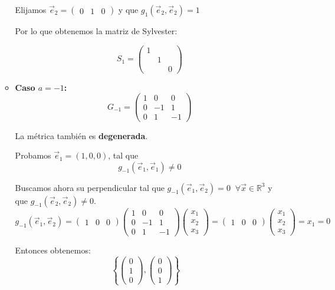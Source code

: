 \documentclass[12pt]{article}
\begin{document}
\begin{ejercicio}[4 puntos]
\begin{enumerate}
\begin{itemize}
				Elijamos \( \vec{e}_2 = \begin{pmatrix} 0 & 1 & 0 \end{pmatrix}\) y que \(g_{1}(\vec{e}_2, \vec{e}_2) = 1\)
				
				Por lo que obtenemos la matriz de Sylvester:
				
				\[
				S_1 = \begin{pmatrix}
					1 &   &   \\
					& 1 &   \\
					&   & 0
				\end{pmatrix}
				\]
				\item \textbf{Caso \( a = -1 \):}
				\[
				G_{-1} = 
				\begin{pmatrix}
					1 & 0 & 0 \\
					0 & -1 & 1 \\
					0 & 1 & -1
				\end{pmatrix}
				\]
				
				La métrica también es \textbf{degenerada}.
				
				Probamos \( \vec{e}_1 = (1,0,0) \), tal que
				\[g_{-1}(\vec{e}_1, \vec{e}_1) \neq 0\]
				
				Buscamos ahora su perpendicular tal que \( g_{-1}(\vec{e}_1, \vec{e}_2) = 0 \;\; \forall \vec{x} \in \mathbb{R}^3 \) y que \( g_{-1}(\vec{e}_2, \vec{e}_2) \neq 0 \).
				\[
				g_{-1}(\vec{e}_1, \vec{e}_2) =
				\begin{pmatrix} 1 & 0 & 0 \end{pmatrix}
				\begin{pmatrix}
					1 & 0 & 0 \\
					0 & -1 & 1 \\
					0 & 1 & -1
				\end{pmatrix}
				\begin{pmatrix} x_1 \\ x_2 \\ x_3 \end{pmatrix}
				= \begin{pmatrix} 1 & 0 & 0 \end{pmatrix}
				\begin{pmatrix} x_1 \\ x_2 \\ x_3 \end{pmatrix}
				= x_1 = 0
				\]
				
				Entonces obtenemos:
				\[
				\left\lbrace \begin{pmatrix} 0 \\ 1 \\ 0 \end{pmatrix}, \begin{pmatrix} 0 \\ 0 \\ 1 \end{pmatrix} \right\rbrace
				\quad 
				\]
				

\end{itemize}
\end{enumerate}
\end{ejercicio}
\end{document}
